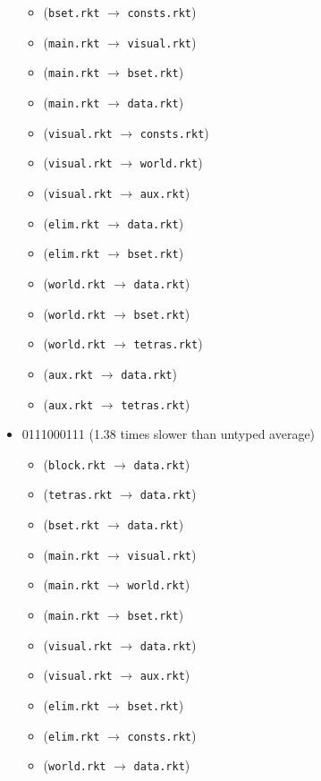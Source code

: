 \documentclass{article}
\newcommand{\mono}[1]{\texttt{#1}}
\begin{document}
\begin{itemize}
\begin{itemize}
  \item (\mono{bset.rkt} $\rightarrow$ \mono{consts.rkt})
  \item (\mono{main.rkt} $\rightarrow$ \mono{visual.rkt})
  \item (\mono{main.rkt} $\rightarrow$ \mono{bset.rkt})
  \item (\mono{main.rkt} $\rightarrow$ \mono{data.rkt})
  \item (\mono{visual.rkt} $\rightarrow$ \mono{consts.rkt})
  \item (\mono{visual.rkt} $\rightarrow$ \mono{world.rkt})
  \item (\mono{visual.rkt} $\rightarrow$ \mono{aux.rkt})
  \item (\mono{elim.rkt} $\rightarrow$ \mono{data.rkt})
  \item (\mono{elim.rkt} $\rightarrow$ \mono{bset.rkt})
  \item (\mono{world.rkt} $\rightarrow$ \mono{data.rkt})
  \item (\mono{world.rkt} $\rightarrow$ \mono{bset.rkt})
  \item (\mono{world.rkt} $\rightarrow$ \mono{tetras.rkt})
  \item (\mono{aux.rkt} $\rightarrow$ \mono{data.rkt})
  \item (\mono{aux.rkt} $\rightarrow$ \mono{tetras.rkt})
  \end{itemize}
\item 0111000111 (1.38 times slower than untyped average)
  \begin{itemize}
  \item (\mono{block.rkt} $\rightarrow$ \mono{data.rkt})
  \item (\mono{tetras.rkt} $\rightarrow$ \mono{data.rkt})
  \item (\mono{bset.rkt} $\rightarrow$ \mono{data.rkt})
  \item (\mono{main.rkt} $\rightarrow$ \mono{visual.rkt})
  \item (\mono{main.rkt} $\rightarrow$ \mono{world.rkt})
  \item (\mono{main.rkt} $\rightarrow$ \mono{bset.rkt})
  \item (\mono{visual.rkt} $\rightarrow$ \mono{data.rkt})
  \item (\mono{visual.rkt} $\rightarrow$ \mono{aux.rkt})
  \item (\mono{elim.rkt} $\rightarrow$ \mono{bset.rkt})
  \item (\mono{elim.rkt} $\rightarrow$ \mono{consts.rkt})
  \item (\mono{world.rkt} $\rightarrow$ \mono{data.rkt})

\end{itemize}
\end{itemize}
\end{document}

